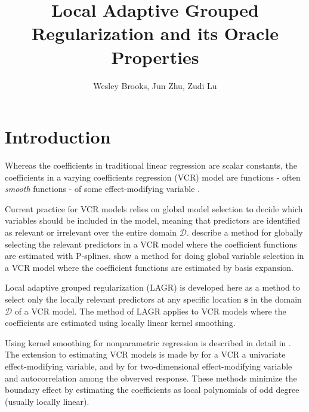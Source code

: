 \documentclass[english]{article}\usepackage[]{graphicx}\usepackage[]{color}
\theoremstyle{plain}
\theoremstyle{plain}
\begin{document}
\title{Local Adaptive Grouped Regularization and its Oracle Properties}


\author{Wesley Brooks, Jun Zhu, Zudi Lu}

\maketitle

\section{Introduction}

Whereas the coefficients in traditional linear regression are scalar
constants, the coefficients in a varying coefficients regression (VCR)
model are functions - often \emph{smooth} functions - of some effect-modifying
variable \citep{Hastie:1993a,Cleveland-Grosse-1991}.

Current practice for VCR models relies on global model selection to
decide which variables should be included in the model, meaning that
predictors are identified as relevant or irrelevant over the entire
domain $\mathcal{D}$. \citet{Antoniadis:2012a} describe a method
for globally selecting the relevant predictors in a VCR model where
the coefficient functions are estimated with P-splines. \citet{Wang-2008a}
show a method for doing global variable selection in a VCR model where
the coefficient functions are estimated by basis expansion.

Local adaptive grouped regularization (LAGR) is developed here as
a method to select only the locally relevant predictors at any specific
location $\bm{s}$ in the domain $\mathcal{D}$ of a VCR model. The
method of LAGR applies to VCR models where the coefficients are estimated
using locally linear kernel smoothing.

Using kernel smoothing for nonparametric regression is described in
detail in \citet*{Fan-Gijbels-1996}. The extension to estimating
VCR models is made by \citet{Fan-Zhang-1999} for a VCR a univariate
effect-modifying variable, and by \citet{Sun-Yan-Zhang-Lu-2014} for
two-dimensional effect-modifying variable and autocorrelation among
the obverved response. These methods minimize the boundary effect
\citep{Hastie:1993b} by estimating the coefficients as local polynomials
of odd degree (usually locally linear).
\end{document}
